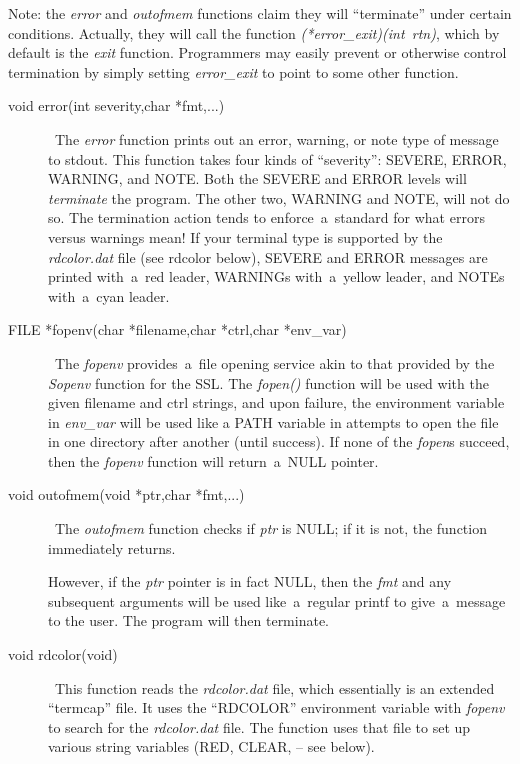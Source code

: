 \documentclass[12pt]{article}
\def\SSL{{\small SSL}}
\begin{document}
Note: the {\em error} and {\em outofmem} functions claim they will
``terminate'' under certain conditions.  Actually, they will call the function
{\em (*error\_exit)(int~rtn)}, which by default is the {\em exit} function.
Programmers may easily prevent or otherwise control termination by simply
setting {\em error\_exit} to point to some other function.

\begin{description}

  \item[void error(int severity,char *fmt,...)] \     The {\em error} function prints out an error, warning, or note type of
    message to stdout.  This function takes four kinds of ``severity'': {\small
    SEVERE}, {\small ERROR}, {\small WARNING}, and {\small NOTE}.  Both the
    {\small SEVERE} and {\small ERROR} levels will {\em terminate} the
    program.  The other two, {\small WARNING} and {\small NOTE}, will not do
    so.  The termination action tends to enforce~a~standard for what errors
    versus warnings mean!  If your terminal type is supported by the {\em
    rdcolor.dat} file (see rdcolor below), {\small SEVERE} and {\small ERROR}
    messages are printed with~a~red leader, {\small WARNING}s with~a~yellow
    leader, and {\small NOTE}s with~a~cyan leader.

  \item[FILE *fopenv(char *filename,char *ctrl,char *env\_var)] \     The {\em fopenv} provides~a~file opening service akin to that provided
    by the {\em Sopenv} function for the \SSL.  The {\em fopen()} function
    will be used with the given filename and ctrl strings, and upon failure,
    the environment variable in {\em env\_var} will be used like a
    {\small PATH} variable in attempts to open the file in one directory after
    another (until success).  If none of the {\em fopen\/}s succeed, then
    the {\em fopenv} function will return~a~{\small NULL} pointer.

  \item[void outofmem(void *ptr,char *fmt,...)] \     The {\em outofmem} function checks if {\em ptr} is {\small NULL}; if it is
    not, the function immediately returns.

    However, if the {\em ptr} pointer is in fact {\small NULL}, then the
    {\em fmt} and any subsequent arguments will be used like~a~regular printf
    to give~a~message to the user.  The program will then terminate.

  \item[void rdcolor(void)] \     This function reads the {\em rdcolor.dat} file, which essentially is an
    extended ``termcap'' file.  It uses the ``RDCOLOR'' environment variable with
    {\em fopenv} to search for the {\em rdcolor.dat} file.  The function uses
    that file to set up various string variables ({\small RED}, {\small CLEAR},
    -- see below).


\end{description}
\end{document}
